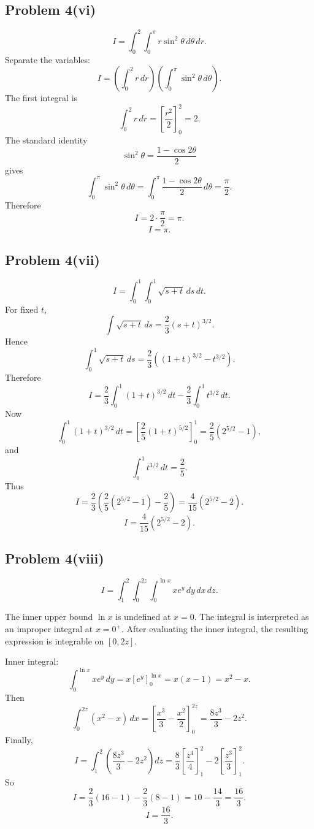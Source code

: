 \documentclass[11pt,a4paper]{article}
\begin{document}
\subsection{Problem 4(vi)}
\[
 I=\int_0^2\int_0^{\pi}r\sin^2\theta\,d\theta\,dr.
\]
Separate the variables:
\[
 I=\left(\int_0^2r\,dr\right)\left(\int_0^{\pi}\sin^2\theta\,d\theta\right).
\]
The first integral is
\[
 \int_0^2r\,dr=\left[\frac{r^2}{2}\right]_0^2=2.
\]
The standard identity
\[
 \sin^2\theta=\frac{1-\cos2\theta}{2}
\]
gives
\[
 \int_0^{\pi}\sin^2\theta\,d\theta
 =\int_0^{\pi}\frac{1-\cos2\theta}{2}\,d\theta
 =\frac{\pi}{2}.
\]
Therefore
\[
 I=2\cdot\frac{\pi}{2}=\pi.
\]
\[
\boxed{I=\pi.}
\]

\subsection{Problem 4(vii)}
\[
 I=\int_0^1\int_0^1\sqrt{s+t}\,ds\,dt.
\]
For fixed \(t\),
\[
 \int\sqrt{s+t}\,ds=\frac23(s+t)^{3/2}.
\]
Hence
\[
 \int_0^1\sqrt{s+t}\,ds
 =\frac23\left((1+t)^{3/2}-t^{3/2}\right).
\]
Therefore
\[
 I=\frac23\int_0^1(1+t)^{3/2}\,dt-\frac23\int_0^1t^{3/2}\,dt.
\]
Now
\[
 \int_0^1(1+t)^{3/2}\,dt=\left[\frac25(1+t)^{5/2}\right]_0^1=\frac25(2^{5/2}-1),
\]
and
\[
 \int_0^1t^{3/2}\,dt=\frac25.
\]
Thus
\[
 I=\frac23\left(\frac25(2^{5/2}-1)-\frac25\right)
 =\frac{4}{15}(2^{5/2}-2).
\]
\[
\boxed{I=\frac{4}{15}(2^{5/2}-2).}
\]

\subsection{Problem 4(viii)}
\[
 I=\int_1^2\int_0^{2z}\int_0^{\ln x}xe^y\,dy\,dx\,dz.
\]
\begin{notebox}
The inner upper bound \(\ln x\) is undefined at \(x=0\).  The integral is interpreted as an improper integral at \(x=0^+\).  After evaluating the inner integral, the resulting expression is integrable on \([0,2z]\).
\end{notebox}
Inner integral:
\[
 \int_0^{\ln x}xe^y\,dy=x[e^y]_0^{\ln x}=x(x-1)=x^2-x.
\]
Then
\[
 \int_0^{2z}(x^2-x)\,dx
 =\left[\frac{x^3}{3}-\frac{x^2}{2}\right]_0^{2z}
 =\frac{8z^3}{3}-2z^2.
\]
Finally,
\[
 I=\int_1^2\left(\frac{8z^3}{3}-2z^2\right)dz
 =\frac83\left[\frac{z^4}{4}\right]_1^2-2\left[\frac{z^3}{3}\right]_1^2.
\]
So
\[
 I=\frac23(16-1)-\frac23(8-1)
 =10-\frac{14}{3}
 =\frac{16}{3}.
\]
\[
\boxed{I=\frac{16}{3}.}
\]
\end{document}
